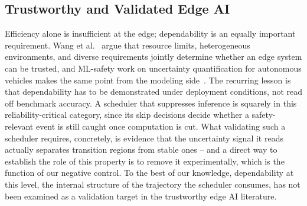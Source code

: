 \documentclass[a4paper,fleqn]{cas-dc}
\begin{document}
\subsection{Trustworthy and Validated Edge AI}
\label{sec:rel_trust}
Efficiency alone is insufficient at the edge; dependability is an equally important requirement.
Wang et al.~\cite{wang2025trustworthy} argue that resource limits, heterogeneous
environments, and diverse requirements jointly determine whether an edge system can
be trusted, and ML-safety work on uncertainty quantification for autonomous vehicles
makes the same point from the modeling side~\cite{mcallister2017concrete,mohseni2020mlsafety,hendrycks2022mlsafety}.
The recurring lesson is that dependability has to be demonstrated under deployment
conditions, not read off benchmark accuracy. A scheduler that suppresses inference
is squarely in this reliability-critical category, since its skip decisions decide
whether a safety-relevant event is still caught once computation is cut. What
validating such a scheduler requires, concretely, is evidence that the uncertainty
signal it reads actually separates transition regions from stable ones -- and a direct way to establish the role of this property is to remove it experimentally, which is the function of our negative control. To the best of our knowledge, dependability at this level, the
internal structure of the trajectory the scheduler consumes, has not been examined
as a validation target in the trustworthy edge AI literature.
\end{document}
